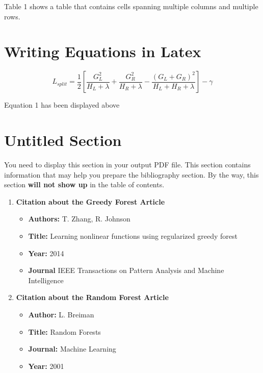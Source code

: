 \documentclass[11pt]{article}
\begin{document}
Table 1 shows a table that contains cells spanning multiple columns and multiple rows.

\noindent \cite{2}
\newpage

\section{Writing Equations in Latex}

\begin{equation}
    L_{split} = \frac{1}{2}[\frac{G_{L}^{2}}{H_{L} + \lambda} + \frac{G_{R}^{2}}{H_{R} + \lambda} - 
    \frac{(G_{L} + G_{R})^{2}}{H_{L} + H_{R} + \lambda}] - \gamma
\end{equation}

Equation 1 has been displayed above \cite{1}

\section*{Untitled Section}

You need to display this section in your output PDF file. This section contains information
that may help you prepare the bibliography section. By the way, this section \textbf{will not
show up} in the table of contents.

\begin{enumerate}
    \item \textbf{Citation about the Greedy Forest Article}
    \begin{itemize}
        \item \textbf{Authors:} T. Zhang, R. Johnson
        \item \textbf{Title:} Learning nonlinear functions using regularized greedy forest
        \item \textbf{Year:} 2014
        \item \textbf{Journal} IEEE Transactions on Pattern Analysis and Machine Intelligence
    \end{itemize}
    \item \textbf{Citation about the Random Forest Article}
    \begin{itemize}
        \item \textbf{Author:} L. Breiman
        \item \textbf{Title:} Random Forests
        \item \textbf{Journal:} Machine Learning
        \item \textbf{Year:} 2001
    \end{itemize}
\end{enumerate}


% 
% 


    
\end{document}
